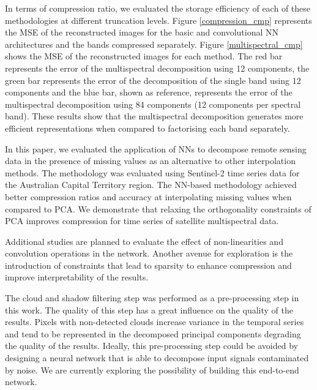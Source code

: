 \documentclass[essd, manuscript]{copernicus}
\begin{document}
In terms of compression ratio, we evaluated the storage efficiency of each of these methodologies at different truncation levels. Figure \ref{compression_cmp} represents the MSE of the reconstructed images for the basic and convolutional NN architectures and the bands compressed separately. 
Figure \ref{multispectral_cmp} shows the MSE of the reconstructed images for each method. The red bar represents the error of the multispectral decomposition using 12 components, the green bar represents the error of the decomposition of the single band using 12 components and the blue bar, shown as reference, represents the error of the multispectral decomposition using 84 components (12 components per spectral band). These results show that the multispectral decomposition generates more efficient representations when compared to factorising each band separately. 


\conclusions  %
In this paper, we evaluated the application of NNs to decompose remote sensing data in the presence of missing values as an alternative to other interpolation methods. The methodology was evaluated using Sentinel-2 time series data for the Australian Capital Territory region. The NN-based methodology achieved better compression ratios and accuracy at interpolating missing values when compared to PCA. We demonstrate that relaxing the orthogonality constraints of PCA improves compression for time series of satellite multispectral data.

Additional studies are planned to evaluate the effect of non-linearities and convolution operations in the network. Another avenue for exploration is the introduction of constraints that lead to sparsity to enhance compression and improve interpretability of the results. 

The cloud and shadow filtering step was performed as a pre-processing step in this work. The quality of this step has a great influence on the quality of the results. Pixels with non-detected clouds increase variance in the temporal series and tend to be represented in the decomposed principal components degrading the quality of the results. Ideally, this pre-processing step could be avoided by designing a neural network that is able to decompose input signals contaminated by noise. We are currently exploring the possibility of building this end-to-end network.

\end{document}

